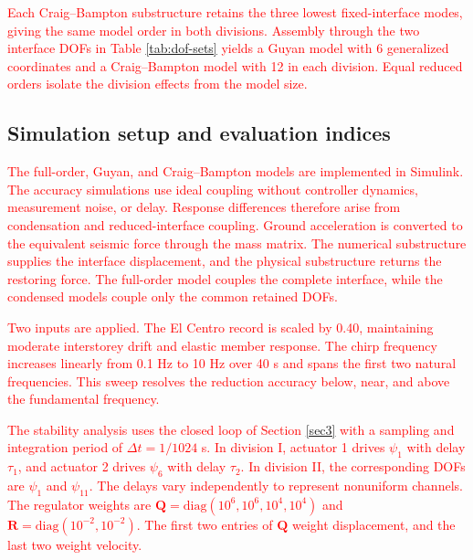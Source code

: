 \documentclass[11pt,a4paper]{article}
\numberwithin{equation}{section}
\newcommand{\rev}[1]{\textcolor{red}{#1}}
\begin{document}
\rev{Each Craig--Bampton substructure retains the three lowest fixed-interface modes, giving the same model order in both divisions. Assembly through the two interface DOFs in Table \ref{tab:dof-sets} yields a Guyan model with 6 generalized coordinates and a Craig--Bampton model with 12 in each division. Equal reduced orders isolate the division effects from the model size.}

\subsection{Simulation setup and evaluation indices}
\label{sec:setup}

\rev{The full-order, Guyan, and Craig--Bampton models are implemented in Simulink. The accuracy simulations use ideal coupling without controller dynamics, measurement noise, or delay. Response differences therefore arise from condensation and reduced-interface coupling. Ground acceleration is converted to the equivalent seismic force through the mass matrix. The numerical substructure supplies the interface displacement, and the physical substructure returns the restoring force. The full-order model couples the complete interface, while the condensed models couple only the common retained DOFs.}

\rev{Two inputs are applied. The El Centro record is scaled by 0.40, maintaining moderate interstorey drift and elastic member response. The chirp frequency increases linearly from 0.1 Hz to 10 Hz over 40 s and spans the first two natural frequencies. This sweep resolves the reduction accuracy below, near, and above the fundamental frequency.}

\rev{The stability analysis uses the closed loop of Section \ref{sec3} with a sampling and integration period of \(\Delta t=1/1024\) s. In division I, actuator 1 drives \(\psi_{1}\) with delay \(\tau_{1}\), and actuator 2 drives \(\psi_{6}\) with delay \(\tau_{2}\). In division II, the corresponding DOFs are \(\psi_{1}\) and \(\psi_{11}\). The delays vary independently to represent nonuniform channels. The regulator weights are \(\mathbf{Q}=\mathrm{diag}(10^{6},10^{6},10^{4},10^{4})\) and \(\mathbf{R}=\mathrm{diag}(10^{-2},10^{-2})\). The first two entries of \(\mathbf{Q}\) weight displacement, and the last two weight velocity.}
\end{document}
